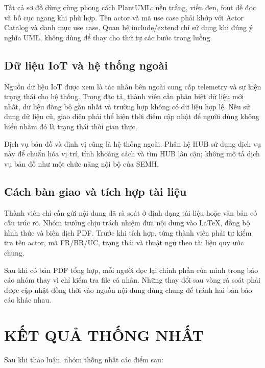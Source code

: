 \documentclass[10pt,a4paper]{article}
\begin{document}
Tất cả sơ đồ dùng cùng phong cách PlantUML: nền trắng, viền đen, font dễ đọc và bố cục ngang khi phù hợp. Tên actor và mã use case phải khớp với Actor Catalog và danh mục use case. Quan hệ include/extend chỉ sử dụng khi đúng ý nghĩa UML, không dùng để thay cho thứ tự các bước trong luồng.

\subsection{Dữ liệu IoT và hệ thống ngoài}

Nguồn dữ liệu IoT được xem là tác nhân bên ngoài cung cấp telemetry và sự kiện trạng thái cho hệ thống. Trong đặc tả, thành viên cần phân biệt dữ liệu mới nhất, dữ liệu đồng bộ gần nhất và trường hợp không có dữ liệu hợp lệ. Nếu sử dụng dữ liệu cũ, giao diện phải thể hiện thời điểm cập nhật để người dùng không hiểu nhầm đó là trạng thái thời gian thực.

Dịch vụ bản đồ và định vị cũng là hệ thống ngoài. Phân hệ HUB sử dụng dịch vụ này để chuẩn hóa vị trí, tính khoảng cách và tìm HUB lân cận; không mô tả dịch vụ bản đồ như một chức năng nội bộ của SEMH.

\subsection{Cách bàn giao và tích hợp tài liệu}

Thành viên chỉ cần gửi nội dung đã rà soát ở định dạng tài liệu hoặc văn bản có cấu trúc rõ. Nhóm trưởng chịu trách nhiệm đưa nội dung vào LaTeX, đồng bộ hình thức và biên dịch PDF. Trước khi tích hợp, từng thành viên phải tự kiểm tra tên actor, mã FR/BR/UC, trạng thái và thuật ngữ theo tài liệu quy ước chung.

Sau khi có bản PDF tổng hợp, mỗi người đọc lại chính phần của mình trong báo cáo nhóm thay vì chỉ kiểm tra file cá nhân. Những thay đổi sau vòng rà soát phải được cập nhật đồng thời vào nguồn nội dung dùng chung để tránh hai bản báo cáo khác nhau.

\section{KẾT QUẢ THỐNG NHẤT}

Sau khi thảo luận, nhóm thống nhất các điểm sau:
\end{document}
